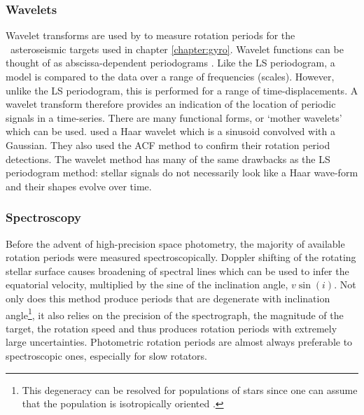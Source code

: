 \subsubsection{Wavelets}
Wavelet transforms are used by \citet{Garcia2014} to measure rotation periods
for the \kepler\ asteroseismic targets used in chapter \ref{chapter:gyro}.
Wavelet functions can be thought of as abscissa-dependent periodograms
\citep{Carter2009}.
Like the LS periodogram, a model is compared to the data over a range of
frequencies (scales).
However, unlike the LS periodogram, this is performed for a range of
time-displacements.
A wavelet transform therefore provides an indication of the location of
periodic signals in a time-series.
There are many functional forms, or `mother wavelets' which can be used.
\citet{Garcia2014} used a Haar wavelet which is a sinusoid convolved with a
Gaussian.
They also used the ACF method to confirm their rotation period detections.
The wavelet method has many of the same drawbacks as the LS periodogram
method: stellar signals do not necessarily look like a Haar wave-form and
their shapes evolve over time.

\subsubsection{Spectroscopy}
Before the advent of high-precision space photometry, the majority of
available rotation periods were measured spectroscopically.
Doppler shifting of the rotating stellar surface causes broadening of spectral
lines which can be used to infer the equatorial velocity, multiplied by the
sine of the inclination angle, $v\sin(i)$.
Not only does this method produce periods that are degenerate with inclination
angle\footnote{This degeneracy can be resolved for populations of stars since
one can assume that the population is isotropically oriented
\citep[\eg][]{Andrews2014}.}, it also relies on the precision of the
spectrograph, the magnitude of the target, the rotation speed and thus
produces rotation periods with extremely large uncertainties.
Photometric rotation periods are almost always preferable to spectroscopic
ones, especially for slow rotators.

